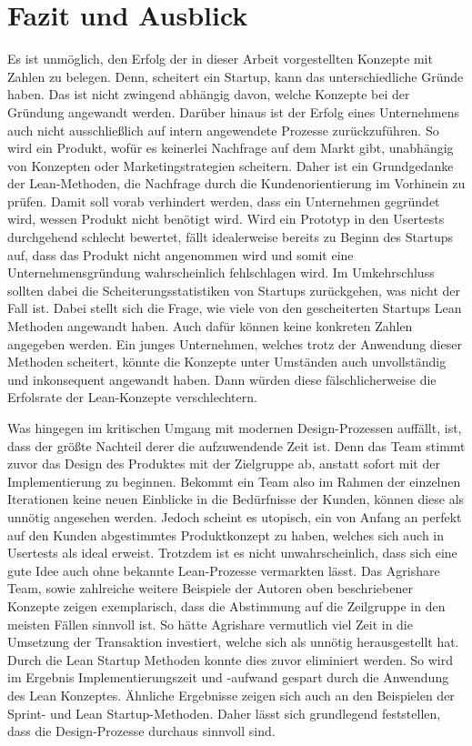 \section{Fazit und Ausblick}
Es ist unmöglich, den Erfolg der in dieser Arbeit vorgestellten Konzepte mit Zahlen zu belegen. Denn, scheitert ein Startup, kann das unterschiedliche Gründe haben. Das ist nicht zwingend abhängig davon, welche Konzepte bei der Gründung angewandt werden. Darüber hinaus ist der Erfolg eines Unternehmens auch nicht ausschließlich auf intern angewendete Prozesse zurückzuführen. So wird ein Produkt, wofür es keinerlei Nachfrage auf dem Markt gibt, unabhängig von Konzepten oder Marketingstrategien scheitern. Daher ist ein Grundgedanke der Lean-Methoden, die Nachfrage durch die Kundenorientierung im Vorhinein zu prüfen. Damit soll vorab verhindert werden, dass ein Unternehmen gegründet wird, wessen Produkt nicht benötigt wird. Wird ein Prototyp in den Usertests durchgehend schlecht bewertet, fällt idealerweise bereits zu Beginn des Startups auf, dass das Produkt nicht angenommen wird und somit eine Unternehmensgründung wahrscheinlich fehlschlagen wird. Im Umkehrschluss sollten dabei die Scheiterungsstatistiken von Startups zurückgehen, was nicht der Fall ist. Dabei stellt sich die Frage, wie viele von den gescheiterten Startups Lean Methoden angewandt haben. Auch dafür können keine konkreten Zahlen angegeben werden. Ein junges Unternehmen, welches trotz der Anwendung dieser Methoden scheitert, könnte die Konzepte unter Umständen auch unvollständig und inkonsequent angewandt haben. Dann würden diese fälschlicherweise die Erfolsrate der Lean-Konzepte verschlechtern. 

Was hingegen im kritischen Umgang mit modernen Design-Prozessen auffällt, ist, dass der größte Nachteil derer die aufzuwendende Zeit ist. Denn das Team stimmt zuvor das Design des Produktes mit der Zielgruppe ab, anstatt sofort mit der Implementierung zu beginnen. Bekommt ein Team also im Rahmen der einzelnen Iterationen keine neuen Einblicke in die Bedürfnisse der Kunden, können diese als unnötig angesehen werden. Jedoch scheint es utopisch, ein von Anfang an perfekt auf den Kunden abgestimmtes Produktkonzept zu haben, welches sich auch in Usertests als ideal erweist. Trotzdem ist es nicht unwahrscheinlich, dass sich eine gute Idee auch ohne bekannte Lean-Prozesse vermarkten lässt. Das Agrishare Team, sowie zahlreiche weitere Beispiele der Autoren oben beschriebener Konzepte zeigen exemplarisch, dass die Abstimmung auf die Zeilgruppe in den meisten Fällen sinnvoll ist. So hätte Agrishare vermutlich viel Zeit in die Umsetzung der Transaktion investiert, welche sich als unnötig herausgestellt hat. Durch die Lean Startup Methoden konnte dies zuvor eliminiert werden. So wird im Ergebnis Implementierungszeit und -aufwand gespart durch die Anwendung des Lean Konzeptes. Ähnliche Ergebnisse zeigen sich auch an den Beispielen der Sprint- und Lean Startup-Methoden. Daher lässt sich grundlegend feststellen, dass die Design-Prozesse durchaus sinnvoll sind.

